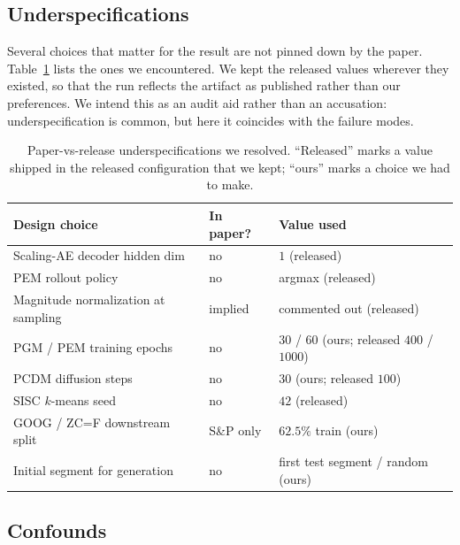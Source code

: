 \documentclass{article}
\begin{document}
\subsection{Underspecifications}
\label{sec:degeneracy:underspec}

Several choices that matter for the result are not pinned down by the paper. Table~\ref{tab:underspec} lists the ones we encountered. We kept the released values wherever they existed, so that the run reflects the artifact as published rather than our preferences. We intend this as an audit aid rather than an accusation: underspecification is common, but here it coincides with the failure modes.

\begin{table}[h]
  \caption{Paper-vs-release underspecifications we resolved. ``Released'' marks a value shipped in the released configuration that we kept; ``ours'' marks a choice we had to make.}
  \label{tab:underspec}
  \centering
  \small
  \setlength{\tabcolsep}{4pt}
  \begin{tabular}{p{5.2cm}p{1.6cm}p{5cm}}
    \toprule
    Design choice & In paper? & Value used \\
    \midrule
    Scaling-AE decoder hidden dim & no & $1$ (released) \\
    PEM rollout policy & no & argmax (released) \\
    Magnitude normalization at sampling & implied & commented out (released) \\
    PGM / PEM training epochs & no & $30$ / $60$ (ours; released $400$ / $1000$) \\
    PCDM diffusion steps & no & $30$ (ours; released $100$) \\
    SISC $k$-means seed & no & $42$ (released) \\
    GOOG / ZC=F downstream split & S\&P only & $62.5\%$ train (ours) \\
    Initial segment for generation & no & first test segment / random (ours) \\
    \bottomrule
  \end{tabular}
\end{table}

\subsection{Confounds}
\label{sec:degeneracy:confounds}
\end{document}
